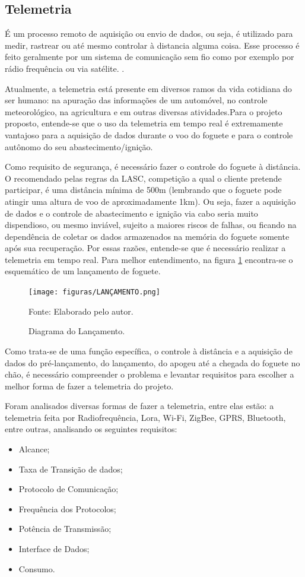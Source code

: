 \subsection{Telemetria}
\par É um processo remoto de aquisição ou envio de dados, ou seja, é utilizado para medir, rastrear ou até mesmo controlar à distancia alguma coisa. Esse processo é feito geralmente por um sistema de comunicação sem fio como por exemplo por rádio frequência ou via satélite. \cite{Telemetria_AERONALTICA}.
\par Atualmente,  a telemetria está presente em diversos ramos da vida cotidiana do ser humano: na apuração das informações de um automóvel, no controle meteorológico, na agricultura e em outras diversas atividades.Para o projeto proposto, entende-se que o uso da telemetria em tempo real é extremamente vantajoso para a aquisição de dados durante o voo do foguete e para o controle autônomo do seu abastecimento/ignição.
\par Como requisito de segurança, é necessário fazer o controle  do foguete à distância. O recomendado pelas regras da LASC, competição a qual o cliente pretende participar, é uma distância mínima de 500m (lembrando que o foguete pode atingir uma altura de voo de aproximadamente 1km). Ou seja, fazer a aquisição de dados e o controle de abastecimento e ignição via cabo seria muito dispendioso, ou mesmo inviável, sujeito a maiores riscos de falhas, ou ficando na dependência de coletar os dados armazenados na memória do foguete somente após sua recuperação. Por essas razões, entende-se que é necessário realizar a telemetria em tempo real. Para melhor entendimento, na figura \ref{fig:Diagrama lançamento}   encontra-se o esquemático de um lançamento de foguete.
\begin{figure}[!htb]
\centering
\texttt{[image: figuras/LANÇAMENTO.png]}
\caption{Diagrama do Lançamento.}
{\footnotesize Fonte: Elaborado pelo autor.}
\label{fig:Diagrama lançamento}
\end{figure}

\par Como trata-se de uma função específica, o controle à distância e a aquisição de dados do pré-lançamento, do lançamento, do apogeu até a chegada do foguete no chão, é necessário compreender o problema e levantar requisitos para escolher a melhor forma de fazer a telemetria do projeto.
\par Foram analisados diversas formas de fazer a telemetria, entre elas estão: a telemetria feita por Radiofrequência, Lora, Wi-Fi, ZigBee, GPRS, Bluetooth, entre outras, analisando os seguintes requisitos: 
\begin{itemize}

\item Alcance;
\item Taxa de Transição de dados;
\item Protocolo de Comunicação;
\item Frequência dos Protocolos;
\item Potência de Transmissão; 
\item Interface de Dados;
\item Consumo.

\end{itemize}


